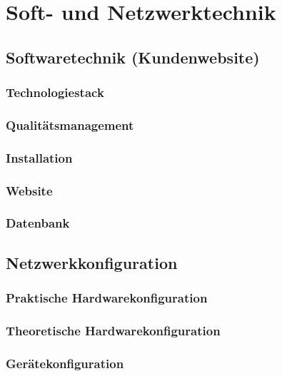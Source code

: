 \chapter{Soft- und Netzwerktechnik}
\label{cha:soft_netzwerktechnik}

\section{Softwaretechnik (Kundenwebsite)}
	\subsection{Technologiestack}
	
	\subsection{Qualitätsmanagement}
	
	\subsection{Installation}
	
	\subsection{Website}
	
	\subsection{Datenbank}
	
	
\section{Netzwerkkonfiguration}
	
	\subsection{Praktische Hardwarekonfiguration}
	
	\subsection{Theoretische Hardwarekonfiguration}
	
	\subsection{Gerätekonfiguration}
	